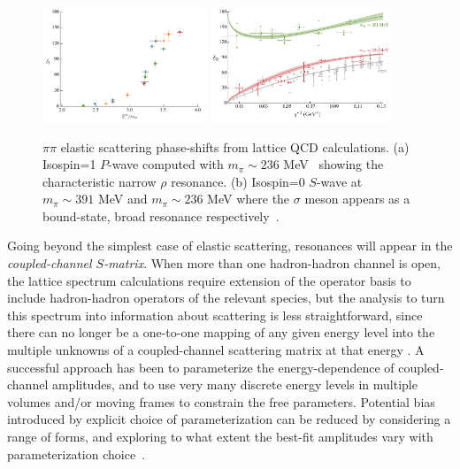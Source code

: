 \begin{figure}
\includegraphics[width=0.44\textwidth]{figures/bulava}
\includegraphics[width=0.48\textwidth]{figures/sigma}
\caption{$\pi\pi$ elastic scattering phase-shifts from lattice QCD calculations. (a) Isospin=1 $P$-wave computed with $m_\pi \sim 236$ MeV~\cite{Bulava:2016mks} showing the characteristic narrow $\rho$ resonance. (b) Isospin=0 $S$-wave at $m_\pi \sim 391$ MeV and $m_\pi \sim 236$ MeV where the $\sigma$ meson appears as a bound-state, broad resonance respectively~\cite{Briceno:2016mjc}.}
\label{elastic}
\end{figure}


Going beyond the simplest case of elastic scattering, resonances will appear in the \emph{coupled-channel $S$-matrix}. When more than one hadron-hadron channel is open, the lattice spectrum calculations require extension of the operator basis to include hadron-hadron operators of the relevant species, but the analysis to turn this spectrum into information about scattering is less straightforward, since there can no longer be a one-to-one mapping of any given energy level into the multiple unknowns of a coupled-channel scattering matrix at that energy \cite{Luscher:1986pf}. A successful approach \cite{Dudek:2014qha, Wilson:2014cna, Wilson:2015dqa, Moir:2016srx, Dudek:2016cru, Briceno:2017qmb} has been to parameterize the energy-dependence of coupled-channel amplitudes, and to use very many discrete energy levels in multiple volumes and/or moving frames to constrain the free parameters. Potential bias introduced by explicit choice of parameterization can be reduced by considering a range of forms, and exploring to what extent the best-fit amplitudes vary with parameterization choice~\cite{Dudek:2014qha, Wilson:2014cna, Wilson:2015dqa, Moir:2016srx, Dudek:2016cru, Briceno:2017qmb}. 

